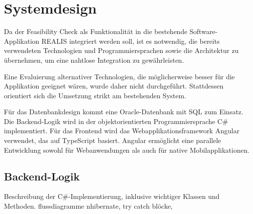 \chapter{Systemdesign}

Da der Feasibility Check als Funktionalität in die bestehende Software-Applikation \gls{REALIS} integriert werden soll, ist es notwendig, die bereits verwendeten Technologien und Programmiersprachen sowie die Architektur zu übernehmen, um eine nahtlose Integration zu gewährleisten.

Eine Evaluierung alternativer Technologien, die möglicherweise besser für die Applikation geeignet wären, wurde daher nicht durchgeführt. Stattdessen orientiert sich die Umsetzung strikt am bestehenden System.

Für das Datenbankdesign kommt eine Oracle-Datenbank mit SQL zum Einsatz. Die Backend-Logik wird in der objektorientierten Programmiersprache C\# implementiert. Für das Frontend wird das Webapplikationsframework Angular verwendet, das auf TypeScript basiert. Angular ermöglicht eine parallele Entwicklung sowohl für Webanwendungen als auch für native Mobilapplikationen.







\section{Backend-Logik}
Beschreibung der C\#-Implementierung, inklusive wichtiger Klassen und Methoden.
flussdiagramme
nhibernate, try catch blöcke, 

